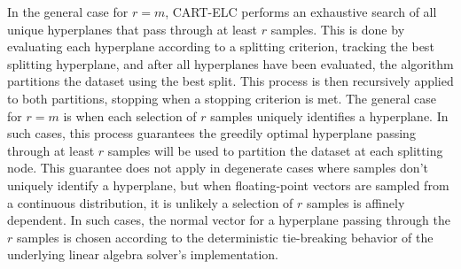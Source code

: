 \documentclass[10pt]{article} %
\begin{document}
\begin{adjustwidth}{1em}{1em}

In the general case for $r=m$, CART-ELC performs an exhaustive search of all unique hyperplanes that pass through at least $r$ samples. This is done by evaluating each hyperplane according to a splitting criterion, tracking the best splitting hyperplane, and after all hyperplanes have been evaluated, the algorithm partitions the dataset using the best split. This process is then recursively applied to both partitions, stopping when a stopping criterion is met. The general case for $r=m$ is when each selection of $r$ samples uniquely identifies a hyperplane. In such cases, this process guarantees the greedily optimal hyperplane passing through at least $r$ samples will be used to partition the dataset at each splitting node. This guarantee does not apply in degenerate cases where samples don't uniquely identify a hyperplane, but when floating-point vectors are sampled from a continuous distribution, it is unlikely a selection of $r$ samples is affinely dependent. In such cases, the normal vector for a hyperplane passing through the $r$ samples is chosen according to the deterministic tie-breaking behavior of the underlying linear algebra solver's implementation. %



\end{adjustwidth}
\end{document}
